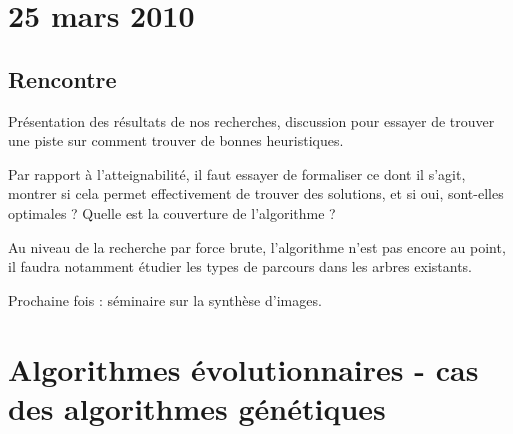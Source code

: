 \documentclass[a4paper,10pt]{article}
\begin{document}
\section{25 mars 2010}
\subsection{Rencontre}
\par Pr\'esentation des r\'esultats de nos recherches, discussion pour essayer de trouver une piste sur comment trouver de bonnes heuristiques.
\par Par rapport \`a l'atteignabilit\'e, il faut essayer de formaliser ce dont il s'agit, montrer si cela permet effectivement de trouver des solutions, et si oui, sont-elles optimales ? Quelle est la couverture de l'algorithme ?
\par Au niveau de la recherche par force brute, l'algorithme n'est pas encore au point, il faudra notamment \'etudier les types de parcours dans les arbres existants.
\par Prochaine fois : s\'eminaire sur la synth\`ese d'images.

\newpage





\clearpage
\appendix
\section{Algorithmes \'evolutionnaires - cas des algorithmes g\'en\'etiques}

\end{document}
